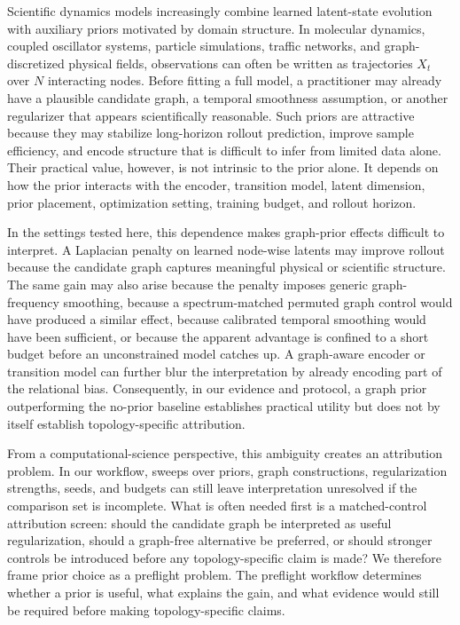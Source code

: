 \documentclass[preprint,12pt]{elsarticle}
\begin{document}
Scientific dynamics models increasingly combine learned latent-state evolution with auxiliary priors motivated by domain structure. In molecular dynamics, coupled oscillator systems, particle simulations, traffic networks, and graph-discretized physical fields, observations can often be written as trajectories $X_t$ over $N$ interacting nodes. Before fitting a full model, a practitioner may already have a plausible candidate graph, a temporal smoothness assumption, or another regularizer that appears scientifically reasonable. Such priors are attractive because they may stabilize long-horizon rollout prediction, improve sample efficiency, and encode structure that is difficult to infer from limited data alone. Their practical value, however, is not intrinsic to the prior alone. It depends on how the prior interacts with the encoder, transition model, latent dimension, prior placement, optimization setting, training budget, and rollout horizon.

In the settings tested here, this dependence makes graph-prior effects difficult to interpret. A Laplacian penalty on learned node-wise latents may improve rollout because the candidate graph captures meaningful physical or scientific structure. The same gain may also arise because the penalty imposes generic graph-frequency smoothing, because a spectrum-matched permuted graph control would have produced a similar effect, because calibrated temporal smoothing would have been sufficient, or because the apparent advantage is confined to a short budget before an unconstrained model catches up. A graph-aware encoder or transition model can further blur the interpretation by already encoding part of the relational bias. Consequently, in our evidence and protocol, a graph prior outperforming the no-prior baseline establishes practical utility but does not by itself establish topology-specific attribution.

From a computational-science perspective, this ambiguity creates an attribution problem. In our workflow, sweeps over priors, graph constructions, regularization strengths, seeds, and budgets can still leave interpretation unresolved if the comparison set is incomplete. What is often needed first is a matched-control attribution screen: should the candidate graph be interpreted as useful regularization, should a graph-free alternative be preferred, or should stronger controls be introduced before any topology-specific claim is made? We therefore frame prior choice as a preflight problem. The preflight workflow determines whether a prior is useful, what explains the gain, and what evidence would still be required before making topology-specific claims.
\end{document}
